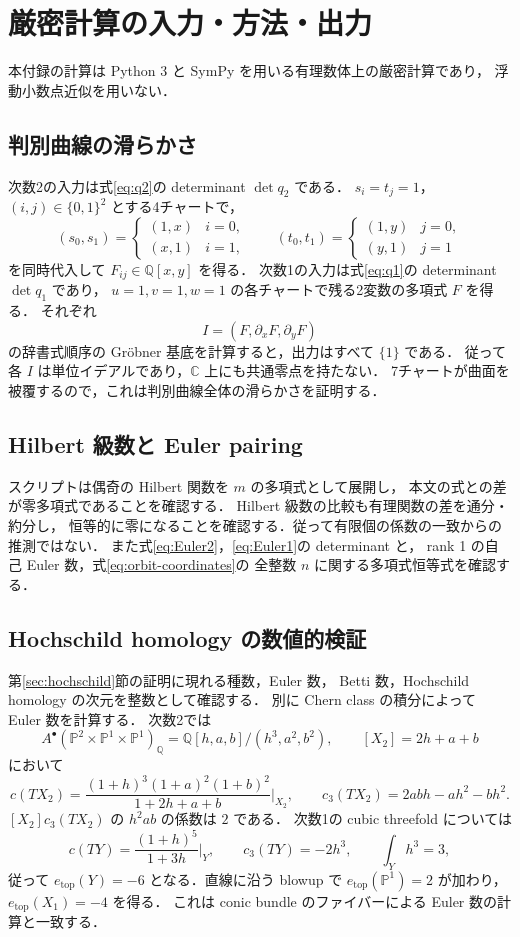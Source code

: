 \section{厳密計算の入力・方法・出力}
\label{sec:computation}

本付録の計算は Python 3 と SymPy を用いる有理数体上の厳密計算であり，
浮動小数点近似を用いない．

\subsection{判別曲線の滑らかさ}

次数2の入力は式\eqref{eq:q2}の determinant $\det q_2$ である．
$s_i=t_j=1$，$(i,j)\in\{0,1\}^2$ とする4チャートで，
\[
 (s_0,s_1)=
 \begin{cases}(1,x)&i=0,\\(x,1)&i=1,\end{cases}
 \qquad
 (t_0,t_1)=
 \begin{cases}(1,y)&j=0,\\(y,1)&j=1\end{cases}
\]
を同時代入して $F_{ij}\in\mathbb Q[x,y]$ を得る．
次数1の入力は式\eqref{eq:q1}の determinant $\det q_1$ であり，
$u=1,v=1,w=1$ の各チャートで残る2変数の多項式 $F$ を得る．
それぞれ
\[
 I=(F,\partial_xF,\partial_yF)
\]
の辞書式順序の Gröbner 基底を計算すると，出力はすべて $\{1\}$ である．
従って各 $I$ は単位イデアルであり，$\mathbb C$ 上にも共通零点を持たない．
7チャートが曲面を被覆するので，これは判別曲線全体の滑らかさを証明する．

\subsection{Hilbert 級数と Euler pairing}

スクリプトは偶奇の Hilbert 関数を $m$ の多項式として展開し，
本文の式との差が零多項式であることを確認する．
Hilbert 級数の比較も有理関数の差を通分・約分し，
恒等的に零になることを確認する．従って有限個の係数の一致からの推測ではない．
また式\eqref{eq:Euler2}，\eqref{eq:Euler1}の determinant と，
rank 1 の自己 Euler 数，式\eqref{eq:orbit-coordinates}の
全整数 $n$ に関する多項式恒等式を確認する．

\subsection{Hochschild homology の数値的検証}

第\ref{sec:hochschild}節の証明に現れる種数，Euler 数，
Betti 数，Hochschild homology の次元を整数として確認する．
別に Chern class の積分によって Euler 数を計算する．
次数2では
\[
 A^\bullet(\mathbb P^2\times\mathbb P^1\times\mathbb P^1)_{\mathbb Q}
 =\mathbb Q[h,a,b]/(h^3,a^2,b^2),\qquad [X_2]=2h+a+b
\]
において
\[
 c(TX_2)=\frac{(1+h)^3(1+a)^2(1+b)^2}{1+2h+a+b}\bigg|_{X_2},
 \qquad
 c_3(TX_2)=2abh-ah^2-bh^2.
\]
$[X_2]c_3(TX_2)$ の $h^2ab$ の係数は $2$ である．
次数1の cubic threefold については
\[
 c(TY)=\frac{(1+h)^5}{1+3h}\bigg|_Y,\qquad
 c_3(TY)=-2h^3,\qquad \int_Yh^3=3,
\]
従って $e_{\mathrm{top}}(Y)=-6$ となる．直線に沿う blowup で
$e_{\mathrm{top}}(\mathbb P^1)=2$ が加わり，
$e_{\mathrm{top}}(X_1)=-4$ を得る．
これは conic bundle のファイバーによる Euler 数の計算と一致する．

